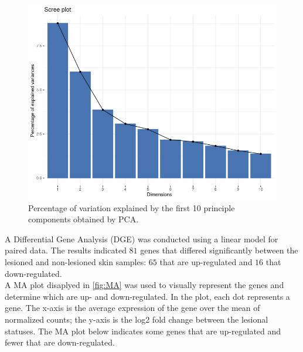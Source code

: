 \documentclass[journal, a4paper]{IEEEtran}
\begin{document}
\begin{figure}[!htp]
    \begin{center}
    \begin{minipage}{0.5 \textwidth}
      \centering
      \includegraphics[width=\textwidth]{scree-plot.png}
      \caption{Percentage of variation explained by the first 10 principle components obtained by PCA.}
      \label{fig:scree-plot}
    \end{minipage}
  \end{center}
\end{figure}

A Differential Gene Analysis (DGE) was conducted using a linear model for paired data. The results indicated $81$ genes that differed significantly between the lesioned and non-lesioned skin samples: $65$ that are up-regulated and $16$ that down-regulated.\\%

A MA plot disaplyed in \ref{fig:MA} was used to visually represent the genes and determine which are up- and down-regulated. In the plot, each dot represents a gene. The x-axis is the average expression of the gene over the mean of normalized counts; the y-axis is the log2 fold change between the lesional statuses. The MA plot below indicates some genes that are up-regulated and fewer that are down-regulated.\\
\end{document}
